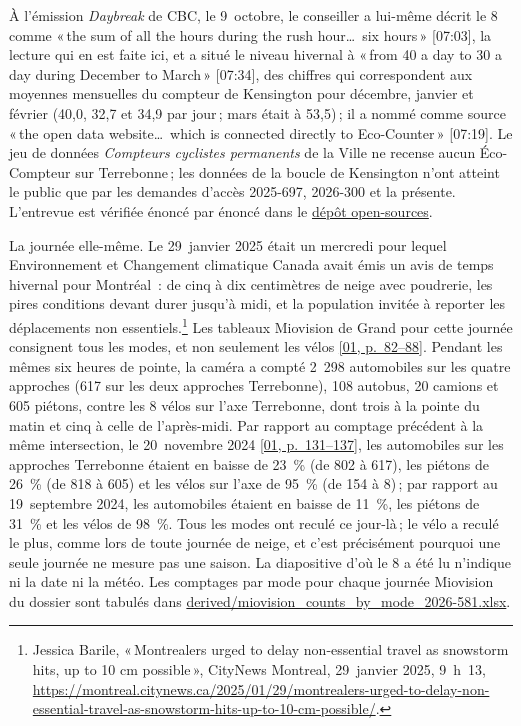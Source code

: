 \documentclass[11pt,letterpaper]{article}
\newcommand{\repourl}{https://github.com/OpenMobilityData/Terrebonne-access-requests}
\newcommand{\doc}[2]{\href{\repourl/blob/main/#1}{#2}}
\newcommand{\pagesurl}{https://openmobilitydata.github.io/Terrebonne-access-requests}
\newcommand{\osurl}{https://github.com/OpenMobilityData/Terrebonne-open-sources}
\newcommand{\pgl}[3]{\href{\pagesurl/\csname bundle#1\endcsname\#page=#2}{\textsf{\small[#1, p.~#3]}}}
\begin{document}
À l'émission \emph{Daybreak} de CBC, le 9~octobre, le conseiller a lui-même
décrit le 8 comme «\,the sum of all the hours during the rush hour\ldots\
six hours\,» [07:03], la lecture qui en est faite ici, et a situé le niveau
hivernal à «\,from 40 a day to 30 a day during December to March\,»
[07:34], des chiffres qui correspondent aux moyennes mensuelles du compteur
de Kensington pour décembre, janvier et février (40,0, 32,7 et 34,9 par
jour\,; mars était à 53,5)\,; il a nommé comme source «\,the open data
website\ldots\ which is connected directly to Eco-Counter\,» [07:19]. Le
jeu de données \emph{Compteurs cyclistes permanents} de la Ville ne
recense aucun Éco-Compteur sur Terrebonne\,; les données de la boucle de
Kensington n'ont atteint le public que par les demandes d'accès 2025-697,
2026-300 et la présente. L'entrevue est vérifiée énoncé par énoncé dans le
\href{\osurl/tree/main/2026-cbc-daybreak-interview}{dépôt open-sources}.

La journée elle-même. Le 29~janvier 2025 était un mercredi pour lequel
Environnement et Changement climatique Canada avait émis un avis de temps
hivernal pour Montréal~: de cinq à dix centimètres de neige avec poudrerie,
les pires conditions devant durer jusqu'à midi, et la population invitée à
reporter les déplacements non essentiels.\footnote{Jessica Barile,
«\,Montrealers urged to delay non-essential travel as snowstorm hits, up to
10 cm possible\,», CityNews Montreal, 29~janvier 2025, 9~h~13,
\url{https://montreal.citynews.ca/2025/01/29/montrealers-urged-to-delay-non-essential-travel-as-snowstorm-hits-up-to-10-cm-possible/}.}
Les tableaux Miovision de Grand pour cette journée consignent tous les
modes, et non seulement les vélos \pgl{01}{82}{82--88}. Pendant les mêmes
six heures de pointe, la caméra a compté 2~298 automobiles sur les quatre
approches (617 sur les deux approches Terrebonne), 108 autobus, 20 camions
et 605 piétons, contre les 8 vélos sur l'axe Terrebonne, dont trois à la
pointe du matin et cinq à celle de l'après-midi. Par rapport au comptage
précédent à la même intersection, le 20~novembre 2024
\pgl{01}{131}{131--137}, les automobiles sur les approches Terrebonne
étaient en baisse de 23~\% (de 802 à 617), les piétons de 26~\% (de 818 à
605) et les vélos sur l'axe de 95~\% (de 154 à 8)\,; par rapport au
19~septembre 2024, les automobiles étaient en baisse de 11~\%, les piétons
de 31~\% et les vélos de 98~\%. Tous les modes ont reculé ce jour-là\,; le
vélo a reculé le plus, comme lors de toute journée de neige, et c'est
précisément pourquoi une seule journée ne mesure pas une saison. La
diapositive d'où le 8 a été lu n'indique ni la date ni la météo. Les
comptages par mode pour chaque journée Miovision du dossier sont tabulés
dans
\doc{2026-581/derived/miovision_counts_by_mode_2026-581.xlsx}{derived/miovision\_counts\_by\_mode\_2026-581.xlsx}.
\end{document}
